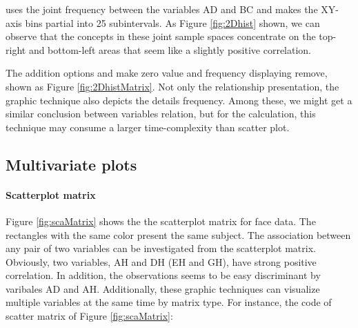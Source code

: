\documentclass[article]{jss}
\begin{document}
uses the joint frequency between the variables AD and BC and makes the XY-axis bins partial into 25 subintervals. As Figure \ref{fig:2Dhist} shown, we can observe that the concepts in these joint sample spaces concentrate on the top-right and bottom-left areas that seem like a slightly positive correlation.



The addition options  and  make zero value and frequency displaying remove, shown as Figure \ref{fig:2DhistMatrix}. Not only the relationship presentation, the graphic technique also depicts the details frequency. Among these, we might get a similar conclusion between variables relation, but for the calculation, this technique may consume a larger time-complexity than scatter plot.









\subsection{Multivariate plots}



\paragraph{Scatterplot matrix}
Figure \ref{fig:scaMatrix} shows
the the scatterplot matrix for face data. The rectangles with
the same color present the same subject. The association between any pair
of two variables can be investigated from the scatterplot
matrix. Obviously, two variables, AH and DH (EH and GH),
have strong positive correlation. In addition, the observations seems to
be easy discriminant by varibales AD and AH.
Additionally, these graphic techniques can visualize multiple variables at the same time by matrix type. For instance, the code of scatter matrix of Figure \ref{fig:scaMatrix}:
\end{document}
